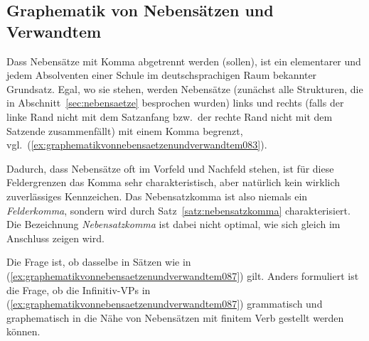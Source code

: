 \subsection{Graphematik von Nebensätzen und Verwandtem}
\label{sec:graphematikvonnebensaetzenundverwandtem}

Dass Nebensätze mit Komma abgetrennt werden (sollen), ist ein elementarer und jedem Absolventen einer Schule im deutschsprachigen Raum bekannter Grundsatz.
Egal, wo sie stehen, werden Nebensätze (zunächst alle Strukturen, die in Abschnitt~\ref{sec:nebensaetze} besprochen wurden) links und rechts (falls der linke Rand nicht mit dem Satzanfang bzw.\ der rechte Rand nicht mit dem Satzende zusammenfällt) mit einem Komma begrenzt, vgl.\ (\ref{ex:graphematikvonnebensaetzenundverwandtem083}).

\begin{exe}
  \ex\label{ex:graphematikvonnebensaetzenundverwandtem083}
  \begin{xlist}
  \end{xlist}
\end{exe}

Dadurch, dass Nebensätze oft im Vorfeld und Nachfeld stehen, ist für diese Feldergrenzen das Komma sehr charakteristisch, aber natürlich kein wirklich zuverlässiges Kennzeichen.
Das Nebensatzkomma ist also niemals ein \textit{Felderkomma}, sondern wird durch Satz~\ref{satz:nebensatzkomma} charakterisiert.
Die Bezeichnung \textit{Nebensatzkomma} ist dabei nicht optimal, wie sich gleich im Anschluss zeigen wird.


Die Frage ist, ob dasselbe in Sätzen wie in (\ref{ex:graphematikvonnebensaetzenundverwandtem087}) gilt.
Anders formuliert ist die Frage, ob die Infinitiv-VPs in (\ref{ex:graphematikvonnebensaetzenundverwandtem087}) grammatisch und graphematisch in die Nähe von Nebensätzen mit finitem Verb gestellt werden können.

\begin{exe}
  \ex\label{ex:graphematikvonnebensaetzenundverwandtem087}
  \begin{xlist}
  \end{xlist}
\end{exe}

